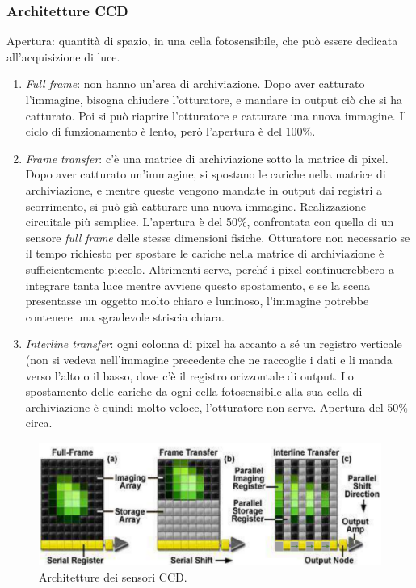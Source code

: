 \documentclass[a4paper,11pt]{article}
\begin{document}
\subsubsection{Architetture CCD}
Apertura: quantità di spazio, in una cella fotosensibile, che può essere dedicata all'acquisizione di luce.
\begin{enumerate}
    \item \textit{Full frame}: non hanno un'area di archiviazione. Dopo aver catturato l'immagine, bisogna chiudere l'otturatore, e mandare in output ciò che si ha catturato. Poi si può riaprire l'otturatore
    e catturare una nuova immagine. Il ciclo di funzionamento è lento, però l'apertura è del 100\%.
    \item \textit{Frame transfer}: c'è una matrice di archiviazione sotto la matrice di pixel. Dopo aver catturato un'immagine, si spostano le cariche nella matrice di archiviazione, e mentre queste vengono
    mandate in output dai registri a scorrimento, si può già catturare una nuova immagine. Realizzazione circuitale più semplice. L'apertura è del 50\%, confrontata con quella di un sensore \textit{full frame} 
    delle stesse dimensioni fisiche. Otturatore non necessario se il tempo richiesto per spostare le cariche nella matrice di archiviazione è sufficientemente piccolo. Altrimenti serve, perché i pixel
    continuerebbero a integrare tanta luce mentre avviene questo spostamento, e se la scena presentasse un oggetto molto chiaro e luminoso, l'immagine potrebbe
    contenere una sgradevole striscia chiara.
    \item \textit{Interline transfer}: ogni colonna di pixel ha accanto a sé un registro verticale (non si vedeva nell'immagine precedente che ne raccoglie i dati e li manda verso l'alto o il basso, dove c'è il
    registro orizzontale di output. Lo spostamento delle cariche da ogni cella fotosensibile alla sua cella di archiviazione è quindi molto veloce, l'otturatore non serve. Apertura del 50\% circa.
\end{enumerate}

\renewcommand{\thefigure}{3.13}
\begin{figure}[!h]
  \centering
    \includegraphics[scale=0.4]{images/3/archs.png}
    \caption{Architetture dei sensori CCD.}
\end{figure}
\end{document}
